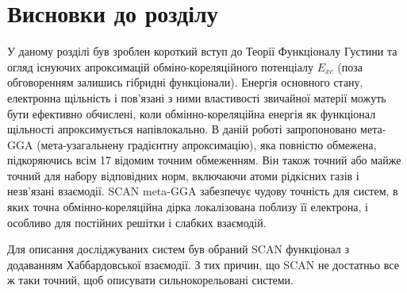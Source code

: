 \section{Висновки до розділу}
У даному розділі був зроблен короткий вступ до Теорії Функціоналу Густини та огляд існуючих апроксимацій обміно-кореляційного потенціалу $E_{xc}$ (поза обговоренням залишись гібридні функціонали).
Енергія основного стану, електронна щільність і пов'язані з ними властивості звичайної матерії можуть бути ефективно обчислені, коли обмінно-кореляційна енергія як функціонал щільності апроксимується напівлокально. В даній роботі запропоновано мета-GGA (мета-узагальнену градієнтну апроксимацію), яка повністю обмежена, підкоряючись всім 17 відомим точним обмеженням. Він також точний або майже точний для набору відповідних норм, включаючи атоми рідкісних газів і незв'язані взаємодії. SCAN meta-GGA забезпечує чудову точність для систем, в яких точна обмінно-кореляційна дірка локалізована поблизу її електрона, і особливо для постійних решітки і слабких взаємодій.

Для описання досліджуваних систем був обраний SCAN функціонал з додаванням Хаббардовської взаємодії. З тих причин, що SCAN не достатньо все ж таки точний, щоб описувати сильнокорельовані системи.




